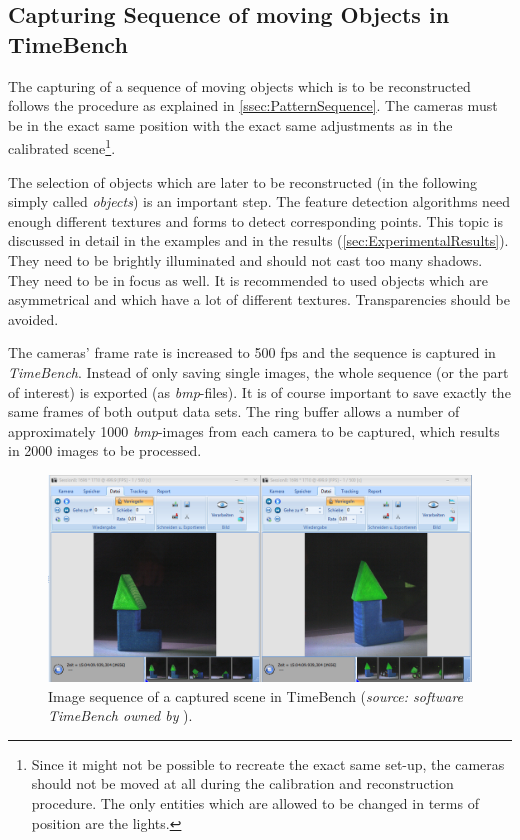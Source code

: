 \subsection{Capturing Sequence of moving Objects in TimeBench}\label{ssec:CaptureReconstrSequence}
The capturing of a sequence of moving objects which is to be reconstructed follows the procedure as explained in \autoref{ssec:PatternSequence}. The cameras must be in the exact same position with the exact same adjustments as in the calibrated scene\footnote{Since it might not be possible to recreate the exact same set-up, the cameras should not be moved at all during the calibration and reconstruction procedure. The only entities which are allowed to be changed in terms of position are the lights.}.

The selection of objects which are later to be reconstructed (in the following simply called \textit{objects}) is an important step. The feature detection algorithms need enough different textures and forms to detect corresponding points. This topic is discussed in detail in the examples and in the results (\autoref{sec:ExperimentalResults}). They need to be brightly illuminated and should not cast too many shadows. They need to be in focus as well. It is recommended to used objects which are asymmetrical and which have a lot of different textures. Transparencies should be avoided.

The cameras' frame rate is increased to 500 fps and the sequence is captured in \textit{TimeBench}. Instead of only saving single images, the whole sequence (or the part of interest) is exported (as \textit{bmp}-files). It is of course important to save exactly the same frames of both output data sets. The ring buffer allows a number of approximately 1000 \textit{bmp}-images from each camera to be captured, which results in 2000 images to be processed.

\begin{figure}[htbp]
		\centering
		\includegraphics[width=1.0\textwidth]{figures/timebenchSequence}
		\caption[Image sequence of a captured scene in TimeBench]{Image sequence of a captured scene in TimeBench (\textit{source: software TimeBench owned by} \cite{Optronis.2016}).}
		\label{fig:timebenchSequence}
\end{figure}


